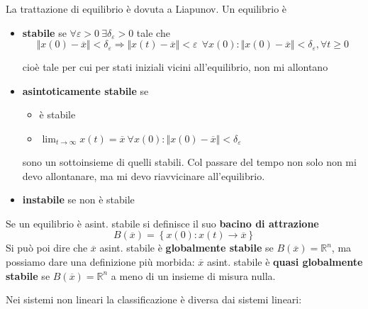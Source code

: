\documentclass[10pt,a4paper]{book}
\begin{document}
La trattazione di equilibrio è dovuta a Liapunov. Un equilibrio è
\begin{itemize}
\item \textbf{stabile} se $\forall \varepsilon  >0\ \exists \delta _{\varepsilon }  >0$ tale che\begin{equation*}
\Vert x( 0) -\overline{x}\Vert < \delta _{\varepsilon } \Rightarrow \Vert x( t) -\overline{x}\Vert < \varepsilon \ \ \forall x( 0) :\Vert x( 0) -\overline{x}\Vert < \delta _{\varepsilon } ,\forall t\geqslant 0
\end{equation*}

cioè tale per cui per stati iniziali vicini all'equilibrio, non mi allontano
\item \textbf{asintoticamente stabile} se
\begin{itemize}
\item è stabile
\item $\lim _{t\rightarrow \infty } x( t) =\overline{x} \ \forall x( 0) :\Vert x( 0) -\overline{x}\Vert < \delta _{\varepsilon }$
\end{itemize}

sono un sottoinsieme di quelli stabili. Col passare del tempo non solo non mi devo allontanare, ma mi devo riavvicinare all'equilibrio.
\item \textbf{instabile} se non è stabile
\end{itemize}

Se un equilibrio è asint. stabile si definisce il suo \textbf{bacino di attrazione}
\begin{equation*}
B(\overline{x}) =\left\{x( 0) :x( t)\rightarrow \overline{x}\right\}
\end{equation*}
Si può poi dire che $\overline{x}$ asint. stabile è \textbf{globalmente stabile} se $B(\overline{x}) =\mathbb{R}^{n}$, ma possiamo dare una definizione più morbida: $\overline{x}$ asint. stabile è \textbf{quasi globalmente stabile} se $B(\overline{x}) =\mathbb{R}^{n}$ a meno di un insieme di misura nulla.

Nei sistemi non lineari la classificazione è diversa dai sistemi lineari:
\end{document}
